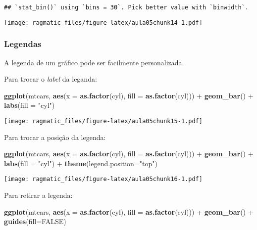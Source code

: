 \documentclass[]{book}
\newenvironment{Shaded}{\begin{snugshade}}{\end{snugshade}}
\newcommand{\KeywordTok}[1]{\textcolor[rgb]{0.13,0.29,0.53}{\textbf{{#1}}}}
\newcommand{\DataTypeTok}[1]{\textcolor[rgb]{0.13,0.29,0.53}{{#1}}}
\newcommand{\StringTok}[1]{\textcolor[rgb]{0.31,0.60,0.02}{{#1}}}
\newcommand{\OtherTok}[1]{\textcolor[rgb]{0.56,0.35,0.01}{{#1}}}
\newcommand{\NormalTok}[1]{{#1}}
\begin{document}
\begin{verbatim}
## `stat_bin()` using `bins = 30`. Pick better value with `binwidth`.
\end{verbatim}

\texttt{[image: ragmatic\_files/figure-latex/aula05chunk14-1.pdf]}

\subsubsection{Legendas}\label{legendas}

A legenda de um gráfico pode ser facilmente personalizada.

Para trocar o \emph{label} da leganda:

\begin{Shaded}
\begin{Highlighting}[]
\KeywordTok{ggplot}\NormalTok{(mtcars, }\KeywordTok{aes}\NormalTok{(}\DataTypeTok{x =} \KeywordTok{as.factor}\NormalTok{(cyl), }\DataTypeTok{fill =} \KeywordTok{as.factor}\NormalTok{(cyl))) +}\StringTok{ }
\StringTok{  }\KeywordTok{geom_bar}\NormalTok{() +}
\StringTok{  }\KeywordTok{labs}\NormalTok{(}\DataTypeTok{fill =} \StringTok{"cyl"}\NormalTok{)}
\end{Highlighting}
\end{Shaded}

\texttt{[image: ragmatic\_files/figure-latex/aula05chunk15-1.pdf]}

Para trocar a posição da legenda:

\begin{Shaded}
\begin{Highlighting}[]
\KeywordTok{ggplot}\NormalTok{(mtcars, }\KeywordTok{aes}\NormalTok{(}\DataTypeTok{x =} \KeywordTok{as.factor}\NormalTok{(cyl), }\DataTypeTok{fill =} \KeywordTok{as.factor}\NormalTok{(cyl))) +}\StringTok{ }
\StringTok{  }\KeywordTok{geom_bar}\NormalTok{() +}
\StringTok{  }\KeywordTok{labs}\NormalTok{(}\DataTypeTok{fill =} \StringTok{"cyl"}\NormalTok{) +}
\StringTok{  }\KeywordTok{theme}\NormalTok{(}\DataTypeTok{legend.position=}\StringTok{"top"}\NormalTok{)}
\end{Highlighting}
\end{Shaded}

\texttt{[image: ragmatic\_files/figure-latex/aula05chunk16-1.pdf]}

Para retirar a legenda:

\begin{Shaded}
\begin{Highlighting}[]
\KeywordTok{ggplot}\NormalTok{(mtcars, }\KeywordTok{aes}\NormalTok{(}\DataTypeTok{x =} \KeywordTok{as.factor}\NormalTok{(cyl), }\DataTypeTok{fill =} \KeywordTok{as.factor}\NormalTok{(cyl))) +}\StringTok{ }
\StringTok{  }\KeywordTok{geom_bar}\NormalTok{() +}
\StringTok{  }\KeywordTok{guides}\NormalTok{(}\DataTypeTok{fill=}\OtherTok{FALSE}\NormalTok{)}
\end{Highlighting}
\end{Shaded}
\end{document}
